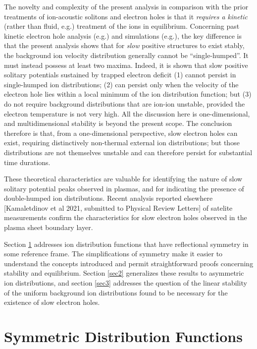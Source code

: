 \documentclass[pre]{revtex4-2}
\begin{document}
The novelty and complexity of the present analysis in comparison with
the prior treatments of ion-acoustic solitons and electron holes is
that it \emph{requires a kinetic} (rather than fluid, e.g.\cite{Kakad2016})
treatment of the ions in equilibrium. Concerning past kinetic electron
hole analysis (e.g.\cite{Dupree1982}) and simulations
(e.g.\cite{Eliasson2004}), the key difference is that the present
analysis shows that for \emph{slow} positive structures to exist
stably, the background ion velocity distribution generally cannot be
``single-humped''. It must instead possess at least two maxima.
Indeed, it is shown that slow positive solitary potentials sustained
by trapped electron deficit (1) cannot persist in single-humped ion
distributions; (2) can persist only when the velocity of the electron
hole lies within a local minimum of the ion distribution function; but (3)
do not require background distributions that are ion-ion unstable,
provided the electron temperature is not very high. All the discussion
here is one-dimensional, and multidimensional stability is beyond the
present scope. The conclusion therefore is that, from a
one-dimensional perspective, slow electron holes can exist, requiring
distinctively non-thermal external ion distributions; but those
distributions are not themselves unstable and can therefore persist
for substantial time durations.

These theoretical characteristics are valuable for identifying the
nature of slow solitary potential peaks observed in plasmas, and for
indicating the presence of double-humped ion distributions. Recent
analysis reported elsewhere [Kamaletdinov et al 2021, submitted to
Physical Review Letters] of satelite measurements confirm the
characteristics for slow electron holes observed in the plasma sheet
boundary layer.

Section \ref{sec1} addresses ion distribution functions that have
reflectional symmetry in some reference frame. The simplifications of
symmetry make it easier to understand the concepts introduced and
permit straightforward proofs concerning stability and
equilibrium. Section \ref{sec2} generalizes these results to
asymmetric ion distributions, and section \ref{sec3} addresses the
question of the linear stability of the uniform background ion
distributions found to be necessary for the existence of slow electron
holes.


\section{Symmetric Distribution Functions}\label{sec1}
\end{document}

